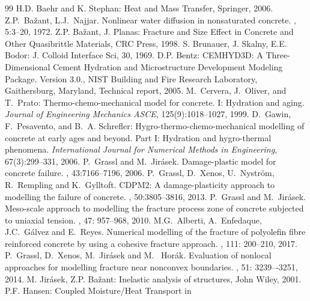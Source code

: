 \documentclass[a4paper]{article}
\begin{document}
\begin{thebibliography}{99}
 H.D. Baehr and K. Stephan: Heat and Mass Transfer, Springer, 2006.
 Z.P.~Ba\v{z}ant, L.J.~Najjar.
\newblock  Nonlinear water diffusion in nonsaturated concrete.
, 5:3--20, 1972.
 Z.P. Ba\v{z}ant, J. Planas: Fracture and Size
  Effect in Concrete and Other Quasibrittle  Materials, CRC Press,
  1998.
 S. Brunauer, J. Skalny, E.E. Bodor: J. Colloid Interface
  Sci, 30, 1969.
 D.P. Bentz: CEMHYD3D: A Three-Dimensional Cement Hydration and Microstructure Development Modeling Package. Version 3.0., NIST Building and Fire Research Laboratory, Gaithersburg, Maryland, Technical report, 2005.
 M.~Cervera, J.~Oliver, and T.~Prato: Thermo-chemo-mechanical model for concrete. I: Hydration and aging. {\em Journal of Engineering Mechanics ASCE}, 125(9):1018--1027, 1999.
 D.~Gawin, F.~Pesavento, and B.~A. Schrefler: Hygro-thermo-chemo-mechanical modelling of concrete at early ages and beyond. Part I: Hydration and hygro-thermal phenomena. {\em International Journal for Numerical Methods in Engineering}, 67(3):299--331, 2006.
 P.~Grassl and M.~Jir\'{a}sek.
\newblock Damage-plastic model for concrete failure.
, 43:7166--7196, 2006.
 P.~Grassl, D.~Xenos, U.~Nystr\"{o}m, R.~Rempling and K.~Gylltoft.
\newblock CDPM2: A damage-plasticity approach to modelling the failure of concrete.
, 50:3805--3816, 2013.
 P.~Grassl and M.~Jir\'{a}sek.
\newblock Meso-scale approach to modelling the fracture process zone of concrete subjected to uniaxial tension.
, 47: 957--968, 2010.
 M.G.~Alberti, A.~Enfedaque, J.C.~G{\'a}lvez and E.~Reyes.
\newblock Numerical modelling of the fracture of polyolefin fibre reinforced concrete by using a cohesive fracture approach.
, 111: 200--210, 2017.
 P.~Grassl, D.~Xenos, M.~Jir\'{a}sek and M.~ Hor\'{a}k.
\newblock  Evaluation of nonlocal approaches for modelling fracture near nonconvex boundaries.
, 51: 3239–-3251, 2014.
 M. Jir\'asek, Z.P. Ba\v zant: Inelastic analysis of
  structures, John Wiley, 2001.
 P.F. Hansen: Coupled Moisture/Heat Transport in

\end{thebibliography}
\end{document}
